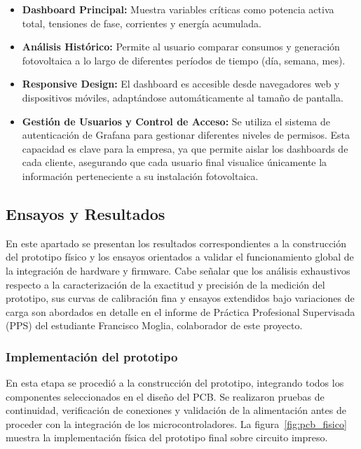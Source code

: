 \documentclass[12pt, a4paper]{article} %
\begin{document}
\begin{itemize}
  \item \textbf{Dashboard Principal:} Muestra variables críticas como potencia activa total, tensiones de fase, corrientes y energía acumulada.
  \item \textbf{Análisis Histórico:} Permite al usuario comparar consumos y generación fotovoltaica a lo largo de diferentes períodos de tiempo (día, semana, mes).
  \item \textbf{Responsive Design:} El dashboard es accesible desde navegadores web y dispositivos móviles, adaptándose automáticamente al tamaño de pantalla.
  \item \textbf{Gestión de Usuarios y Control de Acceso:} Se utiliza el sistema de autenticación de Grafana para gestionar diferentes niveles de permisos. Esta capacidad es clave para la empresa, ya que permite aislar los dashboards de cada cliente, asegurando que cada usuario final visualice únicamente la información perteneciente a su instalación fotovoltaica.
\end{itemize}


\subsection{Ensayos y Resultados}

En este apartado se presentan los resultados correspondientes a la construcción del prototipo físico y los ensayos orientados a validar el funcionamiento global de la integración de hardware y firmware. Cabe señalar que los análisis exhaustivos respecto a la caracterización de la exactitud y precisión de la medición del prototipo, sus curvas de calibración fina y ensayos extendidos bajo variaciones de carga son abordados en detalle en el informe de Práctica Profesional Supervisada (PPS) del estudiante Francisco Moglia, colaborador de este proyecto.

\subsubsection{Implementación del prototipo}

En esta etapa se procedió a la construcción del prototipo, integrando todos los componentes seleccionados en el diseño del PCB. Se realizaron pruebas de continuidad, verificación de conexiones y validación de la alimentación antes de proceder con la integración de los microcontroladores. La figura~\ref{fig:pcb_fisico} muestra la implementación física del prototipo final sobre circuito impreso.
\end{document}
